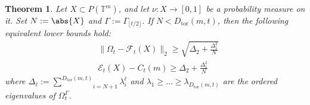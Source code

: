 \documentclass[aps,twocolumn,pra,superscriptaddress,nofootinbib]{revtex4-2}
\newtheorem{theorem}{Theorem}
\newcommand{\sumab}[2]{\underset{#1}{\overset{#2}{\sum}}}
\newcommand{\mF}{\mathcal{F}}
\begin{document}
\begin{theorem}
     Let $X\subset P(\mathbb{T}^{m})$, and let
     $\nu:X\rightarrow [0,1]$ be a probability measure on it. {Set $N:=\abs{X}$ and $\mathsf{\Gamma}:=\mathsf{\Gamma}_{\lfloor t/2\rfloor}$. If $N<D_{\mathrm{tor}}(m,t)$, then} the following equivalent lower bounds
     hold:
     \begin{align}
         & \lVert \Omega_{t}-\mF_{t}(X)\rVert_{2}\geq \sqrt{\Delta_{2}+{\frac{\Delta_{1}^{2}}{N}}} \\
         &  \mathcal{E}_{t}(X)-C_{t}(m)\geq \Delta_{2}+{\frac{\Delta_{1}^{2}}{N}}
     \end{align}
     where {$\Delta_{\ell}:=\sumab{i=N+1}{D_{\mathrm{tor}}(m,t)}\lambda_{i}^{\ell}$} and
     $\lambda_{1}\geq\dots\geq\lambda_{{D_{\mathrm{tor}}(m,t)}}$ are the ordered
     eigenvalues of $\Omega_{t}^{\mathsf{\Gamma}}$.
\end{theorem}
\end{document}
